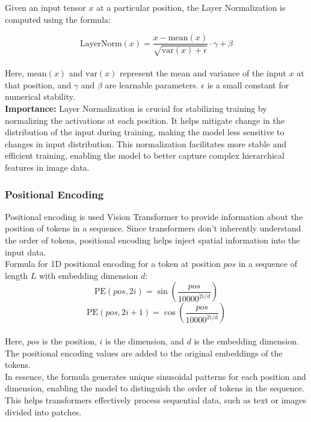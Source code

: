 Given an input tensor $x$ at a particular position, the Layer Normalization is computed using the formula:

\[
\text{LayerNorm}(x) = \frac{x - \text{mean}(x)}{\sqrt{\text{var}(x) + \epsilon}} \cdot \gamma + \beta
\]\\

Here, $\text{mean}(x)$ and $\text{var}(x)$ represent the mean and variance of the input $x$ at that position, and $\gamma$ and $\beta$ are learnable parameters. $\epsilon$ is a small constant for numerical stability.\\

\textbf{Importance:}
Layer Normalization is crucial for stabilizing training by normalizing the activations at each position. It helps mitigate change in the distribution of the input during training, making the model less sensitive to changes in input distribution. This normalization facilitates more stable and efficient training, enabling the model to better capture complex hierarchical features in image data.\\

\subsubsection{Positional Encoding}
Positional encoding is used Vision Transformer to provide information about the position of tokens in a sequence. Since transformers don't inherently understand the order of tokens, positional encoding helps inject spatial information into the input data.\\

Formula for 1D positional encoding for a token at position $pos$ in a sequence of length $L$ with embedding dimension $d$:\\

\[
\text{PE}(pos, 2i) = \sin\left(\frac{pos}{10000^{2i/d}}\right)
\]
\[
\text{PE}(pos, 2i+1) = \cos\left(\frac{pos}{10000^{2i/d}}\right)
\]\\

Here, $pos$ is the position, $i$ is the dimension, and $d$ is the embedding dimension. The positional encoding values are added to the original embeddings of the tokens.\\

In essence, the formula generates unique sinusoidal patterns for each position and dimension, enabling the model to distinguish the order of tokens in the sequence. This helps transformers effectively process sequential data, such as text or images divided into patches.\\

